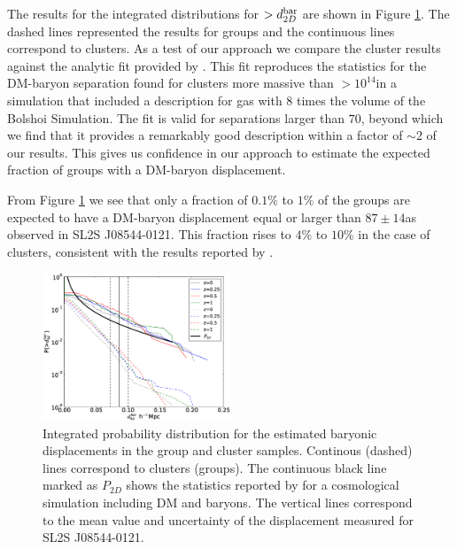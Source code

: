 \documentclass{emulateapj}
\newcommand{\hkpc}{{\ifmmode{h^{-1}{\rm kpc}}\else{$h^{-1}$kpc }\fi}}
\newcommand{\hMsun}{{\ifmmode{h^{-1}{\rm {M_{\odot}}}}\else{$h^{-1}{\rm{M_{\odot}}}$}\fi}}
\newcommand{\bullg}{SL2S J08544-0121}
\begin{document}
The results for the integrated distributions for $>d_{2D}^{\rm bar}$
are shown in Figure \ref{fig:baryonic_displacements}. The dashed lines
represented the results for groups and the continuous lines correspond
to clusters. As a test of our approach we compare the cluster results
against the analytic fit provided by \cite{ForeroRomero2010}. This fit
reproduces the statistics for the DM-baryon separation found for
clusters more massive than $>10^{14}$\hMsun in a simulation
that included a description for gas with $8$ times the volume of the
Bolshoi Simulation. The fit is valid for separations larger than
$70$\hkpc, beyond which we find that it provides a remarkably good
description within a factor of $\sim 2$ of our results. This gives us
confidence in our approach to estimate the expected fraction of
groups with a DM-baryon displacement.

From Figure \ref{fig:baryonic_displacements} we see that only a
fraction of $0.1\%$ to $1\%$ of the groups are expected to have a
DM-baryon displacement equal or larger than $87\pm 14$\hkpc as
observed in \bullg. This fraction rises to $4\%$ to $10\%$ in the case
of clusters, consistent with the results reported by
\cite{ForeroRomero2010}. 



\begin{figure}
\begin{center}
\includegraphics[width=0.5\textwidth]{figure_5.eps}
\end{center}
\caption{Integrated probability distribution for the estimated
  baryonic displacements in the group and cluster samples. Continous (dashed)
  lines correspond to clusters (groups). The continuous black line
  marked as $P_{2D}$ shows the statistics reported by
  \citet{ForeroRomero2010} for a cosmological simulation including DM
  and baryons. The vertical lines correspond to the mean value and
  uncertainty of the displacement measured for \bullg.} 
\label{fig:baryonic_displacements}
\end{figure}
\end{document}
